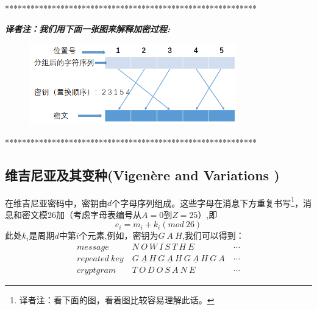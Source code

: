 \documentclass[]{article}
\begin{document}
\vspace{1cm}
***********************************************************\par
\textsl{\textbf{译者注：我们用下面一张图来解释加密过程:}}\par
	\begin{figure}[htb]
		\includegraphics[width=0.8\textwidth]{transpostion-fixedp.png}
	\end{figure}
\par
***********************************************************\par
\vspace{1cm}

\subsection{维吉尼亚及其变种(Vigen\`{e}re and Variations )}
在维吉尼亚密码中，密钥由$d$个字母序列组成。这些字母在消息下方重复书写\footnote{译者注：看下面的图，看着图比较容易理解此话。}，消息和密文模26加（考虑字母表编号从$A=0到Z=25$）,即
\[ e_i = m_i+k_i(mod\ 26) \]
此处$k_i$是周期$d$中第$i$个元素,例如，密钥为$G\ A\ H$,我们可以得到：
\begin{equation}
	\begin{aligned}
	message\ &N\ O\ W\ I\ S\ T\ H\ E\ &\cdots\\
	repeated\ key\ &\underline{G\ A\ H}\ \underline{G\ A\ H}\ \underline{G\ A\ H}\ G\ A\ &\cdots\\
	cryptgram\ &T\ O\ D\ O\ S\ A\ N\ E\ &\cdots\nonumber
	\end{aligned}
\end{equation}
\end{document}
